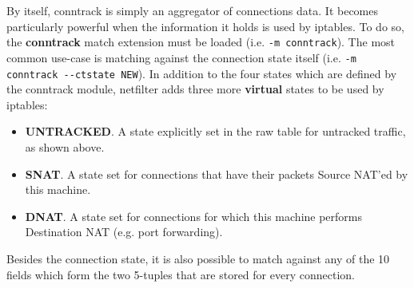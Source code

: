 By itself, conntrack is simply an aggregator of connections data.  It becomes
particularly powerful when the information it holds is used by iptables.  To do
so, the \textbf{conntrack} match extension must be loaded (i.e.
\lstinline{-m conntrack}).  The most common use-case is matching against the
connection state itself (i.e. \lstinline{-m conntrack --ctstate NEW}).  In
addition to the four states which are defined by the conntrack module,
netfilter adds three more \textbf{virtual} states to be used by iptables:
\begin{itemize}
  \item \textbf{UNTRACKED}.  A state explicitly set in the raw table for
    untracked traffic, as shown above.
  \item \textbf{SNAT}.  A state set for connections that have their packets
    Source NAT'ed by this machine.
  \item \textbf{DNAT}.  A state set for connections for which this machine
    performs Destination NAT (e.g. port forwarding).
\end{itemize}

Besides the connection state, it is also possible to match against any of the
10 fields which form the two 5-tuples that are stored for every connection.

